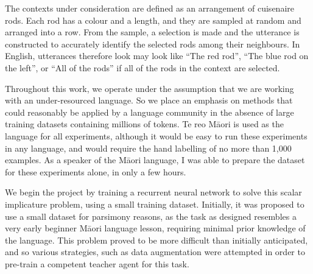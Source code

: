The contexts under consideration are defined as an arrangement of cuisenaire rods. Each rod has a colour and a length, and they are sampled at random and arranged into a row. From the sample, a selection is made and the utterance is constructed to accurately identify the selected rods among their neighbours. In English, utterances therefore look may look like ``The red rod'', ``The blue rod on the left'', or ``All of the rods'' if all of the rods in the context are selected.

Throughout this work, we operate under the assumption that we are working with an under-resourced language. So we place an emphasis on methods that could reasonably be applied by a language community in the absence of large training datasets containing millions of tokens. Te reo Māori is used as the language for all experiments, although it would be easy to run these experiments in any language, and would require the hand labelling of no more than 1,000 examples. As a speaker of the Māori language, I was able to prepare the dataset for these experiments alone, in only a few hours.

We begin the project by training a recurrent neural network to solve this scalar implicature problem, using a small training dataset. Initially, it was proposed to use a small dataset for parsimony reasons, as the task as designed resembles a very early beginner Māori language lesson, requiring minimal prior knowledge of the language. This problem proved to be more difficult than initially anticipated, and so various strategies, such as data augmentation were attempted in order to pre-train a competent teacher agent for this task.
